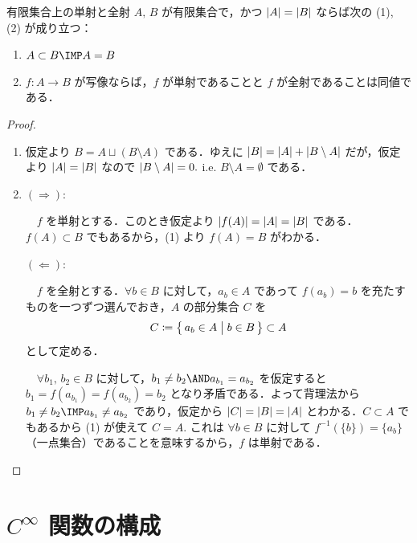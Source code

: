 \documentclass[geometry_main]{subfiles}
\begin{document}
\begin{mylem}[label=lem:finite-bijection]{有限集合上の単射と全射}
    $A,\, B$ が有限集合で，かつ $\abs{A} = \abs{B}$ ならば次の (1), (2) が成り立つ：
    \begin{enumerate}
        \item $A \subset B \IMP A=B$
        \item $f \colon A \to B$ が写像ならば，$f$ が単射であることと $f$ が全射であることは同値である．
    \end{enumerate}
\end{mylem}

\begin{proof}
    \begin{enumerate}
        \item 仮定より $B = A \sqcup (B \setminus A)$ である．ゆえに $\abs{B} = \abs{A} + \abs{B \setminus A}$ だが，仮定より $\abs{A} = \abs{B}$ なので $\abs{B \setminus A} = 0.$ i.e. $B \setminus A = \emptyset$ である．
        \item $\bm{(\Longrightarrow):}$
        
        　$f$ を単射とする．このとき仮定より $\abs{f(A)} = \abs{A} = \abs{B}$ である．$f(A) \subset B$ でもあるから，(1) より $f(A) = B$ がわかる．

        $\bm{(\Longleftarrow):}$

        　$f$ を全射とする．$\forall b \in B$ に対して，$a_b \in A$ であって $f(a_b) = b$ を充たすものを一つずつ選んでおき，$A$ の部分集合 $C$ を
        \begin{align}
            C \coloneqq \bigl\{\, a_b \in A \bigm| b \in B\,\bigr\} \subset A
        \end{align}
        として定める．
        
        　$\forall b_1,\, b_2 \in B$ に対して，$b_1 \neq b_2 \AND a_{b_1} = a_{b_2}$ を仮定すると $b_1 = f(a_{b_1}) = f(a_{b_2}) = b_2$ となり矛盾である．よって背理法から $b_1 \neq b_2 \IMP a_{b_1} \neq a_{b_2}$ であり，仮定から $\abs{C} = \abs{B} = \abs{A}$ とわかる．$C \subset A$ でもあるから (1) が使えて $C = A.$ これは $\forall b \in B$ に対して $f^{-1}(\{b\}) = \{ a_b \}$（一点集合）であることを意味するから，$f$ は単射である．
    \end{enumerate}
\end{proof}


\section{$C^\infty$ 関数の構成}
\end{document}

